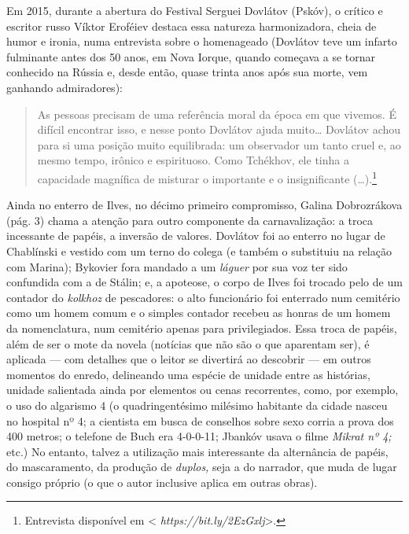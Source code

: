 Em 2015, durante a abertura do Festival Serguei Dovlátov (Pskóv), o
crítico e escritor russo Víktor Eroféiev destaca essa natureza
harmonizadora, cheia de humor e ironia, numa entrevista sobre o
homenageado (Dovlátov teve um infarto fulminante antes dos 50 anos, em
Nova Iorque, quando começava a se tornar conhecido na Rússia e, desde
então, quase trinta anos após sua morte, vem ganhando admiradores):

\begin{quotation}
As pessoas precisam de uma referência moral da época em que vivemos. É
difícil encontrar isso, e nesse ponto Dovlátov ajuda muito\ldots{} Dovlátov
achou para si uma posição muito equilibrada: um observador um tanto
cruel e, ao mesmo tempo, irônico e espirituoso. Como Tchékhov, ele tinha
a capacidade magnífica de misturar o importante e o insignificante
(\ldots{}).\footnote{Entrevista disponível em \textless{}
  \emph{https://bit.ly/2EzGxlj}\textgreater{}.}
\end{quotation}

\begin{center}
{}
\end{center}

Ainda no enterro de Ilves, no décimo primeiro compromisso, Galina
Dobrozrákova (pág. 3) chama a atenção para outro componente da
carnavalização: a troca incessante de papéis, a inversão de valores.
Dovlátov foi ao enterro no lugar de Chablínski e vestido com um terno do
colega (e também o substituiu na relação com Marina); Bykovier fora
mandado a um \emph{láguer} por sua voz ter sido confundida com a de
Stálin; e, a apoteose, o corpo de Ilves foi trocado pelo de um contador
do \emph{kolkhoz} de pescadores: o alto funcionário foi enterrado num
cemitério como um homem comum e o simples contador recebeu as honras de
um homem da nomenclatura, num cemitério apenas para privilegiados. Essa
troca de papéis, além de ser o mote da novela (notícias que não são o
que aparentam ser), é aplicada --- com detalhes que o leitor se
divertirá ao descobrir --- em outros momentos do enredo, delineando uma
espécie de unidade entre as histórias, unidade salientada ainda por
elementos ou cenas recorrentes, como, por exemplo, o uso do algarismo 4
(o quadringentésimo milésimo habitante da cidade nasceu no hospital nº
4; a cientista em busca de conselhos sobre sexo corria a prova dos 400
metros; o telefone de Buch era 4-0-0-11; Jbankóv usava o filme
\emph{Mikrat nº 4;} etc.) No entanto, talvez a utilização mais
interessante da alternância de papéis, do mascaramento, da produção de
\emph{duplos,} seja a do narrador, que muda de lugar consigo próprio (o
que o autor inclusive aplica em outras obras).


